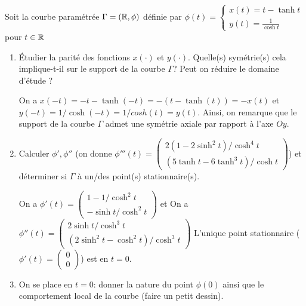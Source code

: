 \documentclass[a4paper]{tp_um}
\begin{document}
		
		
		
		
\exo{}  Soit la courbe paramétrée $\Gamma=\left( \mathbb{R}, \phi \right)$ définie par $ \phi(t) = \begin{cases}x(t)= t - \tanh t \\ y(t) = \frac{1}{\cosh t} \end{cases}$ pour $t\in\mathbb{R}$

	\begin{enumerate}
        \item \'Etudier la parité des fonctions $x(\cdot)$ et $y(\cdot)$. Quelle(s) symétrie(s) cela implique-t-il sur le support de la courbe $\Gamma$? Peut on réduire le domaine d'étude ?

            \bigskip

			
            On a $x(-t) = -t - \tanh(-t) = - (t - \tanh(t)) = -x(t)$ et $y(-t) = 1/\cosh(-t) = 1/cosh(t) = y(t)$. Ainsi, on remarque que le support de la courbe $\Gamma$ admet une symétrie axiale par rapport à l'axe $Oy$.


                    \item Calculer $\phi', \phi''$ (on donne $\phi'''(t)=\begin{pmatrix}
                                2(1- 2\sinh^2 t) /\cosh^4t \\ (5\tanh t - 6 \tanh^3 t ) / \cosh t  
                    \end{pmatrix}$) et déterminer si $\Gamma$ à un/des point(s) stationnaire(s).

On  a $\phi'(t)=\begin{pmatrix}
                                1- 1 /\cosh^2t \\ - \sinh t / \cosh^2 t  
                    \end{pmatrix}$ et 
On  a $\phi''(t)=\begin{pmatrix}
2\sinh t /\cosh^3t \\  (2 \sinh^2 t - \cosh^2 t) / \cosh^3 t 
                    \end{pmatrix}$
                    L'unique point stationnaire ( $\phi'(t) = \begin{pmatrix}
                            0\\0
                    \end{pmatrix}$) est en $t=0$.

            \bigskip


        \item On se place en $t=0$: donner la nature du point $\phi(0)$ ainsi que le comportement local de la courbe (faire un petit dessin).


\end{enumerate}
\end{document}
